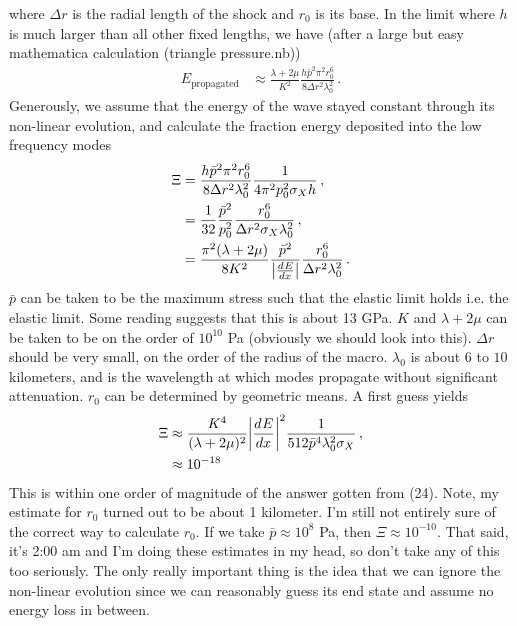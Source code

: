 \documentclass{article}
\newcommand*\te[1]{\text{#1}}
\newcommand*\f[2]{\frac{#1}{#2}}
\newcommand*\td[3]{\frac{d^{#3}#1}{d #2^{#3}}}
\begin{document}
where $\Delta r$ is the radial length of the shock and $r_0$ is its base. In the limit where $h$ is much larger than all other fixed lengths, we have (after a large but easy mathematica calculation (triangle pressure.nb))
\begin{align}
E_{\te{propagated}}&\approx \f{\lambda+2\mu}{K^2}\f{h \bar p^2\pi^2r_0^6}{8\Delta r^2\lambda_0^2}\,.
\end{align}
Generously, we assume that the energy of the wave stayed constant through its non-linear evolution, and calculate the fraction energy deposited into the low frequency modes
\begin{align}
\Xi&=\f{h \bar p^2\pi^2r_0^6}{8\Delta r^2\lambda_0^2}\f{1}{4\pi^2p_0^2\sigma_Xh}\,,\\
&=\f{1}{32}\f{\bar p^2}{p_0^2}\f{r_0^6}{\Delta r^2\sigma_X\lambda_0^2}\,,\\
&=\f{\pi^2(\lambda+2\mu)}{8K^2}\f{\bar p^2}{\abs{\td{E}{x}{}}}\f{r_0^6}{\Delta r^2\lambda_0^2}\,.
\end{align}
$\bar p$ can be taken to be the maximum stress such that the elastic limit holds i.e. the elastic limit. Some reading suggests that this is about 13 GPa. $K$ and $\lambda+2\mu$ can be taken to be on the order of $10^{10}$ Pa (obviously we should look into this). $\Delta r$ should be very small, on the order of the radius of the macro. $\lambda_0$ is about $6$ to $10$ kilometers, and is the wavelength at which modes propagate without significant attenuation. $r_0$ can be determined by geometric means. A first guess yields
\begin{align}
\Xi&\approx\f{K^4}{(\lambda+2\mu)^2}\abs{\td{E}{x}{}}^2\f{1}{512\bar p^4\lambda_0^2\sigma_X}\,,\\
&\approx10^{-18}
\end{align}
This is within one order of magnitude of the answer gotten from (24). Note, my estimate for $r_0$ turned out to be about 1 kilometer. I'm still not entirely sure of the correct way to calculate $r_0$. If we take $\bar p\approx 10^{8}$ Pa, then $\Xi\approx 10^{-10}$. That said, it's 2:00 am and I'm doing these estimates in my head, so don't take any of this too seriously. The only really important thing is the idea that we can ignore the non-linear evolution since we can reasonably guess its end state and assume no energy loss in between.
\end{document}
